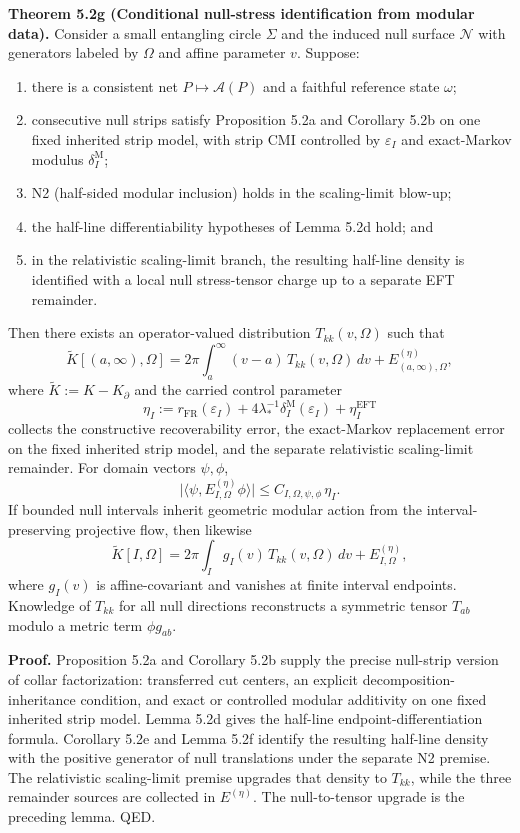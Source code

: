 \textbf{Theorem 5.2g (Conditional null-stress identification from modular data).} Consider a small entangling circle \(\Sigma\) and the induced null surface \(\mathcal N\) with generators labeled by \(\Omega\) and affine parameter \(v\). Suppose:
\begin{enumerate}
\def\labelenumi{\arabic{enumi}.}
\tightlist
\item there is a consistent net \(P\mapsto\mathcal A(P)\) and a faithful reference state \(\omega\);
\item consecutive null strips satisfy Proposition 5.2a and Corollary 5.2b on one fixed inherited strip model, with strip CMI controlled by \(\varepsilon_I\) and exact-Markov modulus \(\delta_I^{\mathrm M}\);
\item N2 (half-sided modular inclusion) holds in the scaling-limit blow-up;
\item the half-line differentiability hypotheses of Lemma 5.2d hold; and
\item in the relativistic scaling-limit branch, the resulting half-line density is identified with a local null stress-tensor charge up to a separate EFT remainder.
\end{enumerate}
Then there exists an operator-valued distribution \(T_{kk}(v,\Omega)\) such that
\[
\widetilde K[(a,\infty),\Omega]
=
2\pi \int_a^\infty (v-a)\,T_{kk}(v,\Omega)\,dv
+
E^{(\eta)}_{(a,\infty),\Omega},
\]
where \(\widetilde K:=K-K_\partial\) and the carried control parameter
\[
\eta_I
:=
r_{\mathrm{FR}}(\varepsilon_I)
+
4\lambda_\ast^{-1}\delta^{\mathrm M}_{I}(\varepsilon_I)
+
\eta_I^{\mathrm{EFT}}
\]
collects the constructive recoverability error, the exact-Markov replacement error on the fixed inherited strip model, and the separate relativistic scaling-limit remainder. For domain vectors \(\psi,\phi\),
\[
\bigl|
\langle\psi,E^{(\eta)}_{I,\Omega}\phi\rangle
\bigr|
\le
C_{I,\Omega,\psi,\phi}\,\eta_I.
\]
If bounded null intervals inherit geometric modular action from the interval-preserving projective flow, then likewise
\[
\widetilde K[I,\Omega]
=
2\pi \int_I g_I(v)\,T_{kk}(v,\Omega)\,dv
+
E^{(\eta)}_{I,\Omega},
\]
where \(g_I(v)\) is affine-covariant and vanishes at finite interval endpoints. Knowledge of \(T_{kk}\) for all null directions reconstructs a symmetric tensor \(T_{ab}\) modulo a metric term \(\phi g_{ab}\).

\textbf{Proof.} Proposition 5.2a and Corollary 5.2b supply the precise null-strip version of collar factorization: transferred cut centers, an explicit decomposition-inheritance condition, and exact or controlled modular additivity on one fixed inherited strip model. Lemma 5.2d gives the half-line endpoint-differentiation formula. Corollary 5.2e and Lemma 5.2f identify the resulting half-line density with the positive generator of null translations under the separate N2 premise. The relativistic scaling-limit premise upgrades that density to \(T_{kk}\), while the three remainder sources are collected in \(E^{(\eta)}\). The null-to-tensor upgrade is the preceding lemma. QED.

